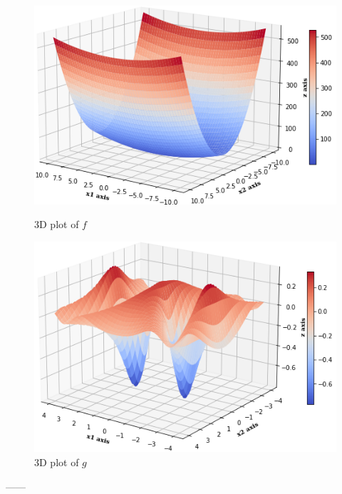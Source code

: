 \begin{figure}[h]
  \centering
  \begin{minipage}[b]{0.42\textwidth}
    \includegraphics[width=\textwidth]{Pictures/3D plot of ellipsoid.png}
    \caption{3D plot of $f$}\label{fig:ellipsoid_3D}
  \end{minipage}
  \hspace{0.3cm} 
  \begin{minipage}[b]{0.42\textwidth}
    \includegraphics[width=\textwidth]{Pictures/3D plot of non convex.png}
    \caption{3D plot of $g$}\label{fig:Nonconvex_3D}
  \end{minipage}
\end{figure}
    
























------